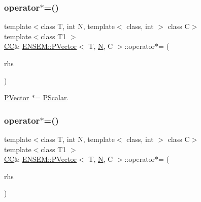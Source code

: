 \mbox{\label{classENSEM_1_1PVector_af17add91449d0507d1a0361ba1a3cc64}} 
\subsubsection{\texorpdfstring{operator$\ast$=()}{operator*=()}\hspace{0.1cm}{\footnotesize\ttfamily [1/2]}}
{\footnotesize\ttfamily template$<$class T, int N, template$<$ class, int $>$ class C$>$ \\
template$<$class T1 $>$ \\
\mbox{\hyperlink{classENSEM_1_1PVector_a92dc0a0a301a3dc96f7be5d337019bc7}{CC}}\& \mbox{\hyperlink{classENSEM_1_1PVector}{E\+N\+S\+E\+M\+::\+P\+Vector}}$<$ T, \mbox{\hyperlink{operator__name__util_8cc_a7722c8ecbb62d99aee7ce68b1752f337}{N}}, C $>$\+::operator$\ast$= (\begin{DoxyParamCaption}\item[{const \mbox{\hyperlink{classENSEM_1_1PScalar}{P\+Scalar}}$<$ T1 $>$ \&}]{rhs }\end{DoxyParamCaption})\hspace{0.3cm}{\ttfamily [inline]}}



\mbox{\hyperlink{classENSEM_1_1PVector}{P\+Vector}} $\ast$= \mbox{\hyperlink{classENSEM_1_1PScalar}{P\+Scalar}}. 

\mbox{\label{classENSEM_1_1PVector_af17add91449d0507d1a0361ba1a3cc64}} 
\subsubsection{\texorpdfstring{operator$\ast$=()}{operator*=()}\hspace{0.1cm}{\footnotesize\ttfamily [2/2]}}
{\footnotesize\ttfamily template$<$class T, int N, template$<$ class, int $>$ class C$>$ \\
template$<$class T1 $>$ \\
\mbox{\hyperlink{classENSEM_1_1PVector_a92dc0a0a301a3dc96f7be5d337019bc7}{CC}}\& \mbox{\hyperlink{classENSEM_1_1PVector}{E\+N\+S\+E\+M\+::\+P\+Vector}}$<$ T, \mbox{\hyperlink{operator__name__util_8cc_a7722c8ecbb62d99aee7ce68b1752f337}{N}}, C $>$\+::operator$\ast$= (\begin{DoxyParamCaption}\item[{const \mbox{\hyperlink{classENSEM_1_1PScalar}{P\+Scalar}}$<$ T1 $>$ \&}]{rhs }\end{DoxyParamCaption})\hspace{0.3cm}{\ttfamily [inline]}}




